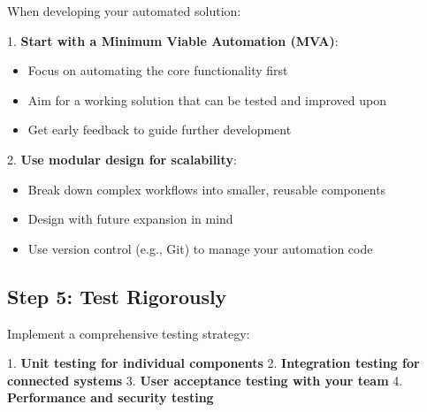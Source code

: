 When developing your automated solution:

1. \textbf{Start with a Minimum Viable Automation (MVA)}:
\begin{itemize}
    \item Focus on automating the core functionality first
    \item Aim for a working solution that can be tested and improved upon
    \item Get early feedback to guide further development
\end{itemize}

2. \textbf{Use modular design for scalability}:
\begin{itemize}
    \item Break down complex workflows into smaller, reusable components
    \item Design with future expansion in mind
    \item Use version control (e.g., Git) to manage your automation code
\end{itemize}


\subsection{Step 5: Test Rigorously}

Implement a comprehensive testing strategy:

1. \textbf{Unit testing for individual components}
2. \textbf{Integration testing for connected systems}
3. \textbf{User acceptance testing with your team}
4. \textbf{Performance and security testing}

